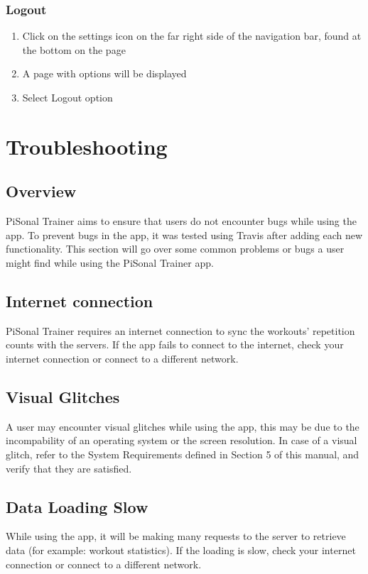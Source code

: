 \documentclass{article}
\begin{document}
\subsubsection {Logout} 
    \begin{enumerate}
        \item Click on the settings icon on the far right side of the navigation bar, found at the bottom on the page
        \item  A page with options will be displayed
        \item  Select Logout option
\end{enumerate}



\section{Troubleshooting}
\subsection{Overview}
PiSonal Trainer aims to ensure that users do not encounter bugs while using the app. To prevent bugs in the app, it was tested using Travis after adding each new functionality. This section will go over some common problems or bugs a user might find while using the PiSonal Trainer app.

\subsection{Internet connection}
PiSonal Trainer requires an internet connection to sync the workouts' repetition counts with the servers. If the app fails to connect to the internet, check your internet connection or connect to a different network.

\subsection{Visual Glitches}
A user may encounter visual glitches while using the app, this may be due to the incompability of an operating system or the screen resolution. In case of a visual glitch, refer to the System Requirements defined in Section 5 of this manual, and verify that they are satisfied.

\subsection{Data Loading Slow}
While using the app, it will be making many requests to the server to retrieve data (for example: workout statistics). If the loading is slow, check your internet connection or connect to a different network.
\end{document}
